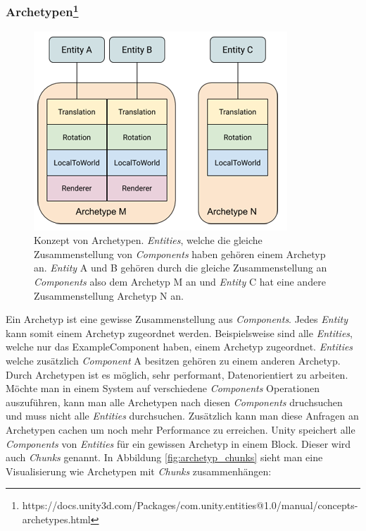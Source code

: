 \subsubsection{Archetypen\footnote{https://docs.unity3d.com/Packages/com.unity.entities@1.0/manual/concepts-archetypes.html}}
\begin{figure}[H]
\begin{center}
\includegraphics[scale=0.7]{Bilder/ArchetypeConcept.png}
\caption{Konzept von Archetypen. \textit{Entities}, welche die gleiche Zusammenstellung von \textit{Components} haben gehören einem Archetyp an. \textit{Entity} A und B gehören durch die gleiche Zusammenstellung an \textit{Components} also dem Archetyp M an und \textit{Entity} C hat eine andere Zusammenstellung Archetyp N an.}
\label{fig:archetype_concept}
\end{center}
\end{figure}
Ein Archetyp ist eine gewisse Zusammenstellung aus \textit{Components}. Jedes \textit{Entity} kann somit einem Archetyp zugeordnet werden. Beispielsweise sind alle \textit{Entities}, welche nur das ExampleComponent haben, einem Archetyp zugeordnet. \textit{Entities} welche zusätzlich \textit{Component} A besitzen gehören zu einem anderen Archetyp. Durch Archetypen ist es möglich, sehr performant, Datenorientiert zu arbeiten. Möchte man in einem System auf verschiedene \textit{Components} Operationen auszuführen, kann man alle Archetypen nach diesen \textit{Components} druchsuchen und muss nicht alle \textit{Entities} durchsuchen. Zusätzlich kann man diese Anfragen an Archetypen cachen um noch mehr Performance zu erreichen. Unity speichert alle \textit{Components} von \textit{Entities} für ein gewissen Archetyp in einem Block. Dieser wird auch \textit{Chunks} genannt. In Abbildung \ref{fig:archetyp_chunks} sieht man eine Visualisierung wie Archetypen mit \textit{Chunks} zusammenhängen:
